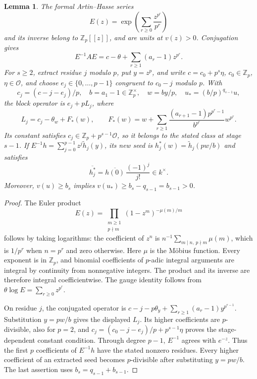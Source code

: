 \documentclass[11pt]{article}
\newtheorem{lemma}[theorem]{Lemma}
\begin{document}
\begin{lemma}\label{lem:artin-hasse-closure}
The formal Artin--Hasse series
\[
 E(z)=\exp\left(\sum_{r\ge0}\frac{z^{p^r}}{p^r}\right)
\]
and its inverse belong to $\mathbb Z_p[[z]]$, and are units at
$v(z)>0$. Conjugation gives
\[
 E^{-1}AE=c-\theta+\sum_{r\ge1}(a_r-1)z^{p^r}.
\]
For $s\ge2$, extract residue $j$ modulo $p$, put $y=z^p$, and
write $c=c_0+p^s\eta$, $c_0\in\mathbb Z_p$, $\eta\in\mathcal O$,
and choose $e_j\in\{0,\ldots,p-1\}$ congruent to $c_0-j$ modulo $p$.
With
\[
 c_j=(c-j-e_j)/p,\quad b=a_1-1\in\mathbb Z_p^\times,
 \quad w=by/p,\quad u_*=(b/p)^{q_{s-1}}u,
\]
the block operator is $e_j+pL_j$, where
\[
 L_j=c_j-\theta_w+F_*(w),\qquad
 F_*(w)=w+\sum_{r\ge1}
       \frac{(a_{r+1}-1)p^{p^r-1}}{b^{p^r}}w^{p^r}.
\]
Its constant satisfies $c_j\in\mathbb Z_p+p^{s-1}\mathcal O$,
so it belongs to the stated class at stage $s-1$. If
$E^{-1}h=\sum_{j=0}^{p-1}z^j\widetilde h_j(y)$, its new seed is
$h_j^*(w)=\widetilde h_j(pw/b)$ and satisfies
\[
 \overline{h_j^*}=\overline{h(0)}\,\frac{(-1)^j}{j!}\in k^\times.
\]
Moreover, $v(u)\ge b_s$ implies
$v(u_*)\ge b_s-q_{s-1}=b_{s-1}>0$.
\end{lemma}
\begin{proof}
The Euler product
\[
 E(z)=\prod_{\substack{m\ge1\\p\nmid m}}
                   (1-z^m)^{-\mu(m)/m}
\]
follows by taking logarithms: the coefficient of $z^n$ is
$n^{-1}\sum_{m\mid n,\ p\nmid m}\mu(m)$, which is $1/p^r$ when
$n=p^r$ and zero otherwise. Here $\mu$ is the M\"obius function.
Every exponent is in $\mathbb Z_p$, and binomial coefficients of
$p$-adic integral arguments are integral by continuity from
nonnegative integers. The product and its inverse are therefore
integral coefficientwise. The gauge identity follows from
$\theta\log E=\sum_{r\ge0}z^{p^r}$.

On residue $j$, the conjugated operator is
$c-j-p\theta_y+\sum_{r\ge1}(a_r-1)y^{p^{r-1}}$.
Substitution $y=pw/b$ gives the displayed $L_j$.
Its higher coefficients are $p$-divisible, also for $p=2$, and
$c_j=(c_0-j-e_j)/p+p^{s-1}\eta$ proves the stage-dependent
constant condition.
Through degree $p-1$, $E^{-1}$ agrees with $e^{-z}$.
Thus the first $p$ coefficients of $E^{-1}h$ have the stated
nonzero residues. Every higher coefficient of an extracted seed
becomes $p$-divisible after substituting $y=pw/b$.
The last assertion uses $b_s=q_{s-1}+b_{s-1}$.
\end{proof}
\end{document}
